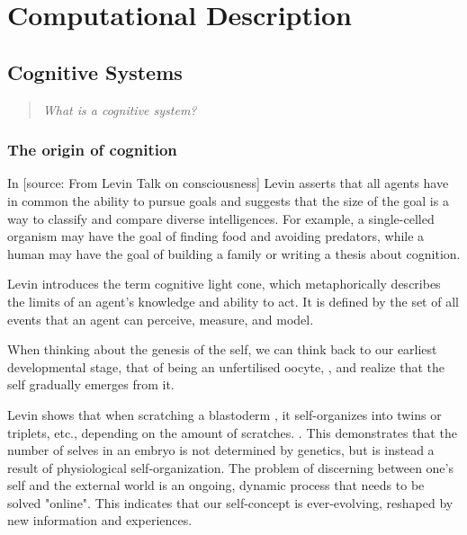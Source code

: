 \chapter{Computational Description}


\section{Cognitive Systems}
\begin{quotation}
    \emph{What is a cognitive system?}
\end{quotation}

\subsection{The origin of cognition} 

In [source: From Levin Talk on consciousness] Levin asserts that all agents have in common the ability to pursue goals and suggests that the size of the goal is a way to classify and compare diverse intelligences. For example, a single-celled organism may have the goal of finding food and avoiding predators, while a human may have the goal of building a family or writing a thesis about cognition.

Levin introduces the term \gls{cognitive light cone}, which metaphorically describes the limits of an agent's knowledge and ability to act. It is defined by the set of all events that an agent can perceive, measure, and model.

When thinking about the genesis of the self, we can think back to our earliest developmental stage, that of being an unfertilised \gls{oocyte}, , and realize that the self gradually emerges from it.

Levin shows that when scratching a \gls{blastoderm} , it self-organizes into twins or triplets, etc., depending on the amount of scratches. . This demonstrates that the number of selves in an \gls{embryo} is not determined by genetics, but is instead a result of physiological self-organization. The problem of discerning between one's self and the external world is an ongoing, dynamic process that needs to be solved "online". This indicates that our self-concept is ever-evolving, reshaped by new information and experiences.

